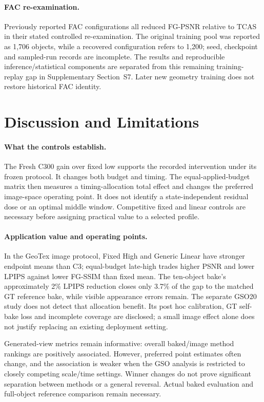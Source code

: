 \documentclass[times,twocolumn,final]{elsarticle}
\begin{document}
\paragraph{FAC re-examination.}
\label{subsec:facreported}
Previously reported FAC configurations all reduced FG-PSNR relative to TCAS in their stated controlled re-examination. The original training pool was reported as 1,706 objects, while a recovered configuration refers to 1,200; seed, checkpoint and sampled-run records are incomplete. The results and reproducible inference/statistical components are separated from this remaining training-replay gap in Supplementary Section~S7. Later new geometry training does not restore historical FAC identity.


\FloatBarrier
\section{Discussion and Limitations}
\label{sec:limitations}

\paragraph{What the controls establish.}
The Fresh C300 gain over fixed low supports the recorded intervention under its frozen protocol. It changes both budget and timing. The equal-applied-budget matrix then measures a timing-allocation total effect and changes the preferred image-space operating point. It does not identify a state-independent residual dose or an optimal middle window. Competitive fixed and linear controls are necessary before assigning practical value to a selected profile.

\paragraph{Application value and operating points.}
In the GeoTex image protocol, Fixed High and Generic Linear have stronger endpoint means than C3; equal-budget late-high trades higher PSNR and lower LPIPS against lower FG-SSIM than fixed mean. The ten-object bake's approximately 2\% LPIPS reduction closes only 3.7\% of the gap to the matched GT reference bake, while visible appearance errors remain. The separate GSO20 study does not detect that allocation benefit. Its post hoc calibration, GT self-bake loss and incomplete coverage are disclosed; a small image effect alone does not justify replacing an existing deployment setting.

Generated-view metrics remain informative: overall baked/image method rankings are positively associated. However, preferred point estimates often change, and the association is weaker when the GSO analysis is restricted to closely competing scale/time settings. Winner changes do not prove significant separation between methods or a general reversal. Actual baked evaluation and full-object reference comparison remain necessary.
\end{document}
